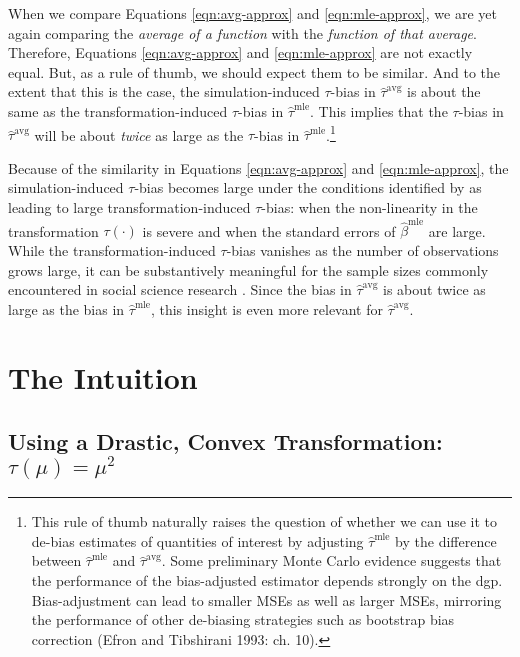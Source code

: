 \documentclass[11pt]{article}
\begin{document}
When we compare Equations \ref{eqn:avg-approx} and \ref{eqn:mle-approx}, we are yet again comparing the \textit{average of a function} with the \textit{function of that average}.
Therefore, Equations \ref{eqn:avg-approx} and \ref{eqn:mle-approx} are not exactly equal.
But, as a rule of thumb, we should expect them to be similar.
And to the extent that this is the case, the simulation-induced $\tau$-bias in $\hat{\tau}^\text{avg}$ is about the same as the transformation-induced $\tau$-bias in $\hat{\tau}^\text{mle}$. This implies that the $\tau$-bias in $\hat{\tau}^\text{avg}$ will be about \emph{twice} as large as the $\tau$-bias in $\hat{\tau}^\text{mle}$.\footnote{This rule of thumb naturally raises the question of whether we can use it to de-bias estimates of quantities of interest by adjusting $\hat{\tau}^\text{mle}$ by the difference between $\hat{\tau}^\text{mle}$ and $\hat{\tau}^\text{avg}$.
Some preliminary Monte Carlo evidence suggests that the performance of the bias-adjusted estimator depends strongly on the dgp.
Bias-adjustment can lead to smaller MSEs as well as larger MSEs, mirroring the performance of other de-biasing strategies such as bootstrap bias correction (Efron and Tibshirani 1993: ch. 10).}


Because of the similarity in Equations \ref{eqn:avg-approx} and \ref{eqn:mle-approx}, the simulation-induced $\tau$-bias becomes large under the conditions identified by \cite{Rainey2017} as leading to large transformation-induced $\tau$-bias: when the non-linearity in the transformation $\tau(\cdot)$ is severe and when the standard errors of $\hat{\beta}^\text{mle}$ are large.
While the transformation-induced $\tau$-bias vanishes as the number of observations grows large, it can be substantively meaningful for the sample sizes commonly encountered in social science research \citep{Rainey2017}. Since the bias in $\hat{\tau}^\text{avg}$ is about twice as large as the bias in $\hat{\tau}^\text{mle}$, this insight is even more relevant for $\hat{\tau}^\text{avg}$.



\section*{The Intuition}

\subsection*{Using a Drastic, Convex Transformation: $\tau(\mu) = \mu^2$}
\end{document}

